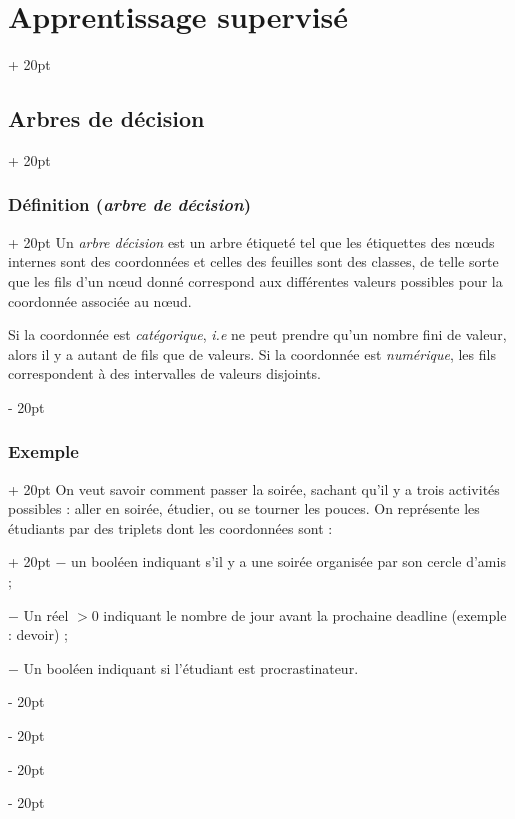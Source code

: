 \documentclass[a4paper, 12pt, twoside]{article}
\newcommand{\ind}[1][20pt]{\advance\leftskip + #1}
\newcommand{\deind}[1][20pt]{\advance\leftskip - #1}
\newenvironment{indt}[2][20pt]{#2 \par \ind[#1]}{\par \deind} %
\begin{document}
\begin{indt}{\section{Apprentissage supervisé}}
\begin{indt}{\subsection{Arbres de décision}}
            \begin{indt}{\subsubsection{Définition (\textit{arbre de décision})}}
                Un \emph{arbre décision} est un arbre étiqueté tel que les étiquettes des n\oe uds internes sont des coordonnées et celles des feuilles sont des classes, de telle sorte que les fils d'un n\oe ud donné correspond aux différentes valeurs possibles pour la coordonnée associée au n\oe ud.

                Si la coordonnée est \emph{catégorique}, \textit{i.e} ne peut prendre qu'un nombre fini de valeur, alors il y a autant de fils que de valeurs.
                Si la coordonnée est \emph{numérique}, les fils correspondent à des intervalles de valeurs disjoints.
            \end{indt}

            \vspace{12pt}
            
            \begin{indt}{\subsubsection{Exemple}}
                On veut savoir comment passer la soirée, sachant qu'il y a trois activités possibles : aller en soirée, étudier, ou se tourner les pouces.
                \begin{indt}{On représente les étudiants par des triplets dont les coordonnées sont :}
                    $-$ un booléen indiquant s'il y a une soirée organisée par son cercle d'amis ;

                    $-$ Un réel $> 0$ indiquant le nombre de jour avant la prochaine deadline (exemple : devoir) ;

                    $-$ Un booléen indiquant si l'étudiant est procrastinateur.
                \end{indt}


\end{indt}
\end{indt}
\end{indt}
\end{document}
